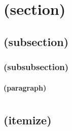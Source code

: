 


\makeatletter
\section{ (section)}
\Blindtext
\subsection{ (subsection)}
\Blindtext
\subsubsection{ (subsubsection)}
\Blindtext
\paragraph{ (paragraph)}
\Blindtext
\section{\blindtext@list}%
\subsection{\blindtext@listEx (itemize)}%
\Blinditemize[3]
